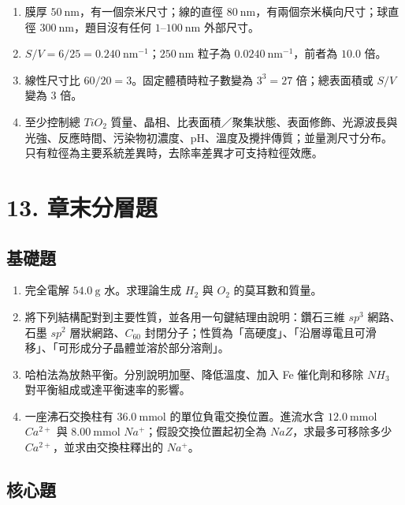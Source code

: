 \documentclass[11pt,a4paper]{article}
\providecommand{\tightlist}{%
  \setlength{\itemsep}{0pt}\setlength{\parskip}{0pt}}
\begin{document}
\begin{enumerate}
\def\labelenumi{\arabic{enumi}.}
\tightlist
\item
  膜厚 \(50\ \mathrm{nm}\)，有一個奈米尺寸；線的直徑 \(80\ \mathrm{nm}\)，有兩個奈米橫向尺寸；球直徑 \(300\ \mathrm{nm}\)，題目沒有任何 \(1\)--\(100\ \mathrm{nm}\) 外部尺寸。
\item
  \(S/V=6/25=0.240\ \mathrm{nm^{-1}}\)；\(250\ \mathrm{nm}\) 粒子為 \(0.0240\ \mathrm{nm^{-1}}\)，前者為 \(10.0\) 倍。
\item
  線性尺寸比 \(60/20=3\)。固定體積時粒子數變為 \(3^3=27\) 倍；總表面積或 \(S/V\) 變為 \(3\) 倍。
\item
  至少控制總 \(TiO_2\) 質量、晶相、比表面積／聚集狀態、表面修飾、光源波長與光強、反應時間、污染物初濃度、pH、溫度及攪拌傳質；並量測尺寸分布。只有粒徑為主要系統差異時，去除率差異才可支持粒徑效應。
\end{enumerate}

\section{13. 章末分層題}\label{ux7ae0ux672bux5206ux5c64ux984c}

\subsection{基礎題}\label{ux57faux790eux984c}

\begin{enumerate}
\def\labelenumi{\arabic{enumi}.}
\item
  完全電解 \(54.0\ \mathrm{g}\) 水。求理論生成 \(H_2\) 與 \(O_2\) 的莫耳數和質量。
\item
  將下列結構配對到主要性質，並各用一句鍵結理由說明：鑽石三維 \(sp^3\) 網路、石墨 \(sp^2\) 層狀網路、\(C_{60}\) 封閉分子；性質為「高硬度」、「沿層導電且可滑移」、「可形成分子晶體並溶於部分溶劑」。
\item
  哈柏法為放熱平衡。分別說明加壓、降低溫度、加入 Fe 催化劑和移除 \(NH_3\) 對平衡組成或達平衡速率的影響。
\item
  一座沸石交換柱有 \(36.0\ \mathrm{mmol}\) 的單位負電交換位置。進流水含 \(12.0\ \mathrm{mmol}\) \(Ca^{2+}\) 與 \(8.00\ \mathrm{mmol}\) \(Na^+\)；假設交換位置起初全為 \(NaZ\)，求最多可移除多少 \(Ca^{2+}\)，並求由交換柱釋出的 \(Na^+\)。
\end{enumerate}

\subsection{核心題}\label{ux6838ux5fc3ux984c}
\end{document}
